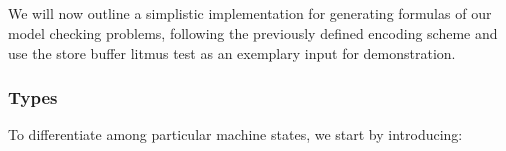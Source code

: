 
\newpage
\subsection{{\SMTLIB}}

We will now outline a simplistic {\CPP} implementation for generating {\SMTLIB} formulas of our model checking problems, following the previously defined encoding scheme
and use the store buffer litmus test as an exemplary input for demonstration.

\subsubsection*{Types}

To differentiate among particular machine states, we start by introducing:%


